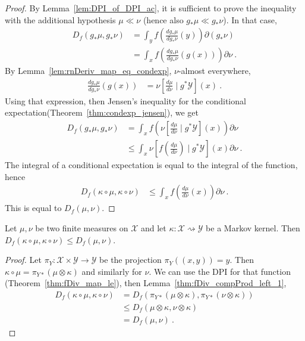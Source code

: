 \begin{proof}\leanok
{}
By Lemma~\ref{lem:DPI_of_DPI_ac}, it is sufficient to prove the inequality with the additional hypothesis $\mu \ll \nu$ (hence also $g_* \mu \ll g_*\nu$). In that case,
\begin{align*}
D_f(g_* \mu, g_* \nu)
&= \int_y f \left( \frac{d g_* \mu}{d g_* \nu}(y) \right) \partial(g_* \nu)
\\
&= \int_{x} f \left( \frac{d g_* \mu}{d g_* \nu}(g(x)) \right) \partial\nu
\: .
\end{align*}
By Lemma~\ref{lem:rnDeriv_map_eq_condexp}, $\nu$-almost everywhere,
\begin{align*}
\frac{d g_* \mu}{d g_* \nu}(g(x))
&= \nu\left[\frac{d \mu}{d \nu} \mid g^* \mathcal Y \right](x)
\: .
\end{align*}
Using that expression, then Jensen's inequality for the conditional expectation(Theorem~\ref{thm:condexp_jensen}), we get
\begin{align*}
D_f(g_* \mu, g_* \nu)
&= \int_{x} f \left( \nu\left[\frac{d \mu}{d \nu} \mid g^* \mathcal Y \right](x) \right) \partial\nu
\\
&\le \int_{x} \nu\left[ f \left( \frac{d \mu}{d \nu} \right) \mid g^* \mathcal Y \right](x) \partial\nu
\: .
\end{align*}
The integral of a conditional expectation is equal to the integral of the function, hence
\begin{align*}
D_f(\kappa \circ \mu, \kappa \circ \nu)
&\le \int_{x} f \left( \frac{d \mu}{d \nu}(x) \right) \partial\nu
\: .
\end{align*}
This is equal to $D_f(\mu, \nu)$.
\end{proof}


\begin{theorem}
  \label{thm:fDiv_data_proc_3}
  \leanok
  Let $\mu, \nu$ be two finite measures on $\mathcal X$ and let $\kappa : \mathcal X \rightsquigarrow \mathcal Y$ be a Markov kernel.
  Then $D_f(\kappa \circ \mu, \kappa \circ \nu) \le D_f(\mu, \nu)$.
\end{theorem}

\begin{proof}\leanok
{}
Let $\pi_Y : \mathcal X \times \mathcal Y \to \mathcal Y$ be the projection $\pi_Y((x,y)) = y$.
Then $\kappa \circ \mu = \pi_{Y*}(\mu \otimes \kappa)$ and similarly for $\nu$.
We can use the DPI for that function (Theorem~\ref{thm:fDiv_map_le}), then Lemma~\ref{thm:fDiv_compProd_left_1},
\begin{align*}
D_f(\kappa \circ \mu, \kappa \circ \nu)
&= D_f(\pi_{Y*}(\mu \otimes \kappa), \pi_{Y*}(\nu \otimes \kappa))
\\
&\le D_f(\mu \otimes \kappa, \nu \otimes \kappa)
\\
&= D_f(\mu, \nu)
\: .
\end{align*}
\end{proof}



